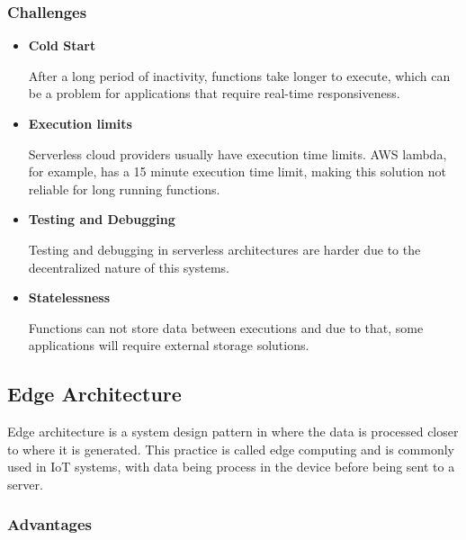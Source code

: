 \subsubsection{Challenges}
\begin{itemize}
	\item \textbf{Cold Start}

	      After a long period of inactivity, functions take longer to execute, which
	      can be a problem for applications that require real-time responsiveness.

	\item \textbf{Execution limits}

	      Serverless cloud providers usually have execution time limits. AWS lambda,
	      for example, has a 15 minute execution time limit, making this solution
	      not reliable for long running functions.

	\item \textbf{Testing and Debugging}

	      Testing and debugging in serverless architectures are harder due to the
	      decentralized nature of this systems.

	\item \textbf{Statelessness}

	      Functions can not store data between executions and due to that, some
	      applications will require external storage solutions.
\end{itemize}

\subsection{Edge Architecture}
Edge architecture is a system design pattern in where the data is processed
closer to where it is generated. This practice is called edge computing and
is commonly used in IoT systems, with data being process in the device
before being sent to a server.

\subsubsection{Advantages}

